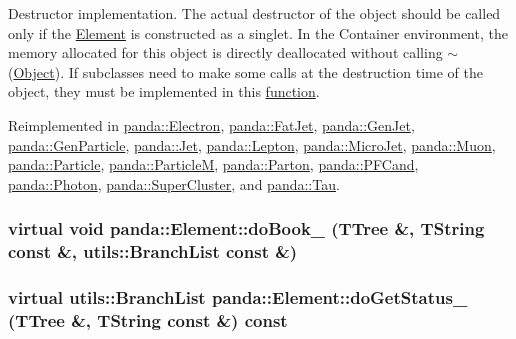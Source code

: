 Destructor implementation. The actual destructor of the object should be called only if the \hyperlink{classpanda_1_1Element}{Element} is constructed as a singlet. In the Container environment, the memory allocated for this object is directly deallocated without calling $\sim$(\hyperlink{classpanda_1_1Object}{Object}). If subclasses need to make some calls at the destruction time of the object, they must be implemented in this \hyperlink{namespacepanda_1_1function}{function}. 

Reimplemented in \hyperlink{classpanda_1_1Electron_a9e9a34d904d5cc02ab895e73cdaf6d7f}{panda::Electron}, \hyperlink{classpanda_1_1FatJet_a421049d4b4315facb5bda39746f1a38b}{panda::FatJet}, \hyperlink{classpanda_1_1GenJet_a4a10379464d97681df56ba78c59d9ec9}{panda::GenJet}, \hyperlink{classpanda_1_1GenParticle_a3741159cb9918fc4a7bf714995d72469}{panda::GenParticle}, \hyperlink{classpanda_1_1Jet_adbd430a93e346588348e1eebaa90c42a}{panda::Jet}, \hyperlink{classpanda_1_1Lepton_af8bb4d531bdddbf51f479f7eb0dae175}{panda::Lepton}, \hyperlink{classpanda_1_1MicroJet_a89f2dbacfc1c34c4f34185ea305f8797}{panda::MicroJet}, \hyperlink{classpanda_1_1Muon_aa982002bedb53cacab127270c53e54e8}{panda::Muon}, \hyperlink{classpanda_1_1Particle_ad1a5f606b804ac2ec5d7e391aba6bda6}{panda::Particle}, \hyperlink{classpanda_1_1ParticleM_abef15d28e6e33ee92c0b318bd41af2ca}{panda::ParticleM}, \hyperlink{classpanda_1_1Parton_a54783d8795081067290078d39305e21c}{panda::Parton}, \hyperlink{classpanda_1_1PFCand_a30a87718470988f020ce75d7e990868b}{panda::PFCand}, \hyperlink{classpanda_1_1Photon_a03611f9014bd137d9aa651ac938575c7}{panda::Photon}, \hyperlink{classpanda_1_1SuperCluster_aaa4fb78fe99ff655b1a25f0e1081f2ac}{panda::SuperCluster}, and \hyperlink{classpanda_1_1Tau_a7caf1a64e1c468e27a6a88c34ab97457}{panda::Tau}.\hypertarget{classpanda_1_1Element_af581eef9f2f192fbe4169d397a30eb48}{
\subsubsection[{doBook\_\-}]{\setlength{\rightskip}{0pt plus 5cm}virtual void panda::Element::doBook\_\- (TTree \&, \/  TString const \&, \/  {\bf utils::BranchList} const \&)}}
\label{classpanda_1_1Element_af581eef9f2f192fbe4169d397a30eb48}
\hypertarget{classpanda_1_1Element_aeac30a79f7ce156033a2dd7538fc919d}{
\subsubsection[{doGetStatus\_\-}]{\setlength{\rightskip}{0pt plus 5cm}virtual {\bf utils::BranchList} panda::Element::doGetStatus\_\- (TTree \&, \/  TString const \&) const}}
\label{classpanda_1_1Element_aeac30a79f7ce156033a2dd7538fc919d}


